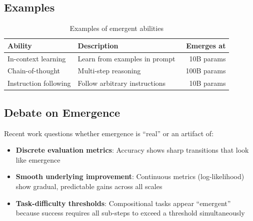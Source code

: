 \subsection{Examples}

\begin{table}[H]
\centering
\caption{Examples of emergent abilities}
\begin{tabularx}{\textwidth}{lXr}
\toprule
\textbf{Ability} & \textbf{Description} & \textbf{Emerges at} \\
\midrule
In-context learning & Learn from examples in prompt & ~10B params \\
Chain-of-thought & Multi-step reasoning & ~100B params \\
Instruction following & Follow arbitrary instructions & ~10B params \\
\bottomrule
\end{tabularx}
\end{table}

\subsection{Debate on Emergence}

Recent work questions whether emergence is ``real'' or an artifact of:
\begin{itemize}
    \item \textbf{Discrete evaluation metrics}: Accuracy shows sharp transitions that look like emergence
    \item \textbf{Smooth underlying improvement}: Continuous metrics (log-likelihood) show gradual, predictable gains across all scales
    \item \textbf{Task-difficulty thresholds}: Compositional tasks appear ``emergent'' because success requires all sub-steps to exceed a threshold simultaneously
\end{itemize}

